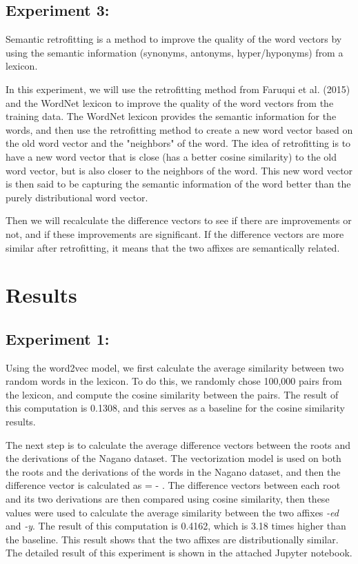 \documentclass[12pt]{article}
\begin{document}
\subsection{Experiment 3:}
    Semantic retrofitting is a method to improve the quality of the word vectors by using the semantic information (synonyms, antonyms, hyper/hyponyms) from a lexicon. 

    In this experiment, we will use the retrofitting method from Faruqui et al. (2015) and the WordNet lexicon to improve the quality of the word vectors from the training data. The WordNet lexicon provides the semantic information for the words, and then use the retrofitting method to create a new word vector based on the old word vector and the "neighbors" of the word. The idea of retrofitting is to have a new word vector that is close (has a better cosine similarity) to the old word vector, but is also closer to the neighbors of the word. This new word vector is then said to be capturing the semantic information of the word better than the purely distributional word vector.

    Then we will recalculate the difference vectors to see if there are improvements or not, and if these improvements are significant. If the difference vectors are more similar after retrofitting, it means that the two affixes are semantically related.

\section{Results}
    \subsection{Experiment 1:}
    Using the word2vec model, we first calculate the average similarity between two random words in the lexicon. To do this, we randomly chose 100,000 pairs from the lexicon, and compute the cosine similarity between the pairs. The result of this computation is 0.1308, and this serves as a baseline for the cosine similarity results. 

    The next step is to calculate the average difference vectors between the roots and the derivations of the Nagano dataset. The vectorization model is used on both the roots and the derivations of the words in the Nagano dataset, and then the difference vector is calculated as  =  - . The difference vectors between each root and its two derivations are then compared using cosine similarity, then these values were used to calculate the average similarity between the two affixes \emph{-ed} and \emph{-y}. The result of this computation is 0.4162, which is 3.18 times higher than the baseline. This result shows that the two affixes are distributionally similar. The detailed result of this experiment is shown in the attached Jupyter notebook.
\end{document}
